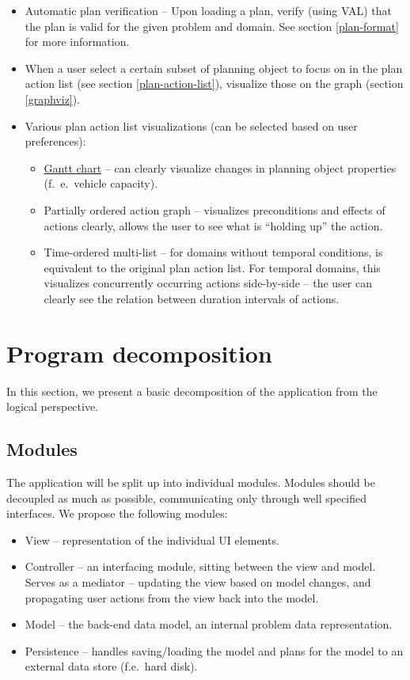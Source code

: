\documentclass[10pt,a4paper,oneside]{article}
\begin{document}
\begin{itemize}
\item Automatic plan verification -- Upon loading a plan, verify (using VAL) that the plan is valid for the given problem and domain. See section \ref{plan-format} for more information.
\item When a user select a certain subset of planning object to focus on in the plan action list (see section \ref{plan-action-list}), visualize those on the graph (section \ref{graphviz}).
\item Various plan action list visualizations (can be selected based on user preferences):
\begin{itemize}
\item \href{https://en.wikipedia.org/wiki/Gantt_chart}{Gantt chart} -- can clearly visualize changes in planning object properties (f.~e.~vehicle capacity).
\item Partially ordered action graph -- visualizes preconditions and effects of actions clearly, allows the user to see what is ``holding up'' the action.
\item Time-ordered multi-list -- for domains without temporal conditions, is equivalent to the original plan action list. For temporal domains, this visualizes concurrently occurring actions side-by-side -- the user can clearly see the relation between duration intervals of actions.
\end{itemize}
\end{itemize}









\section{Program decomposition}

In this section, we present a basic decomposition of the application from the logical perspective.

\subsection{Modules} \label{modules}

The application will be split up into individual modules.
Modules should be decoupled as much as possible, communicating only through well specified interfaces.
We propose the following modules:

\begin{itemize}
\item View -- representation of the individual UI elements.
\item Controller -- an interfacing module, sitting between the view and model. Serves as a mediator -- updating the view based on model changes, and propagating user actions from the view back into the model.
\item Model -- the back-end data model, an internal problem data representation.
\item Persistence -- handles saving/loading the model and plans for the model to an external data store (f.e.~hard disk).
\end{itemize}
\end{document}
